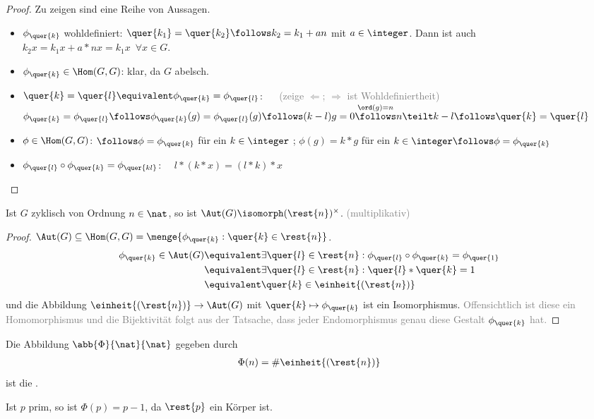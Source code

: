 \begin{proof}
	Zu zeigen sind eine Reihe von Aussagen.
	\begin{itemize}
		\item $\phi_{\quer{k}}$ wohldefiniert: $\quer{k_1} = \quer{k_2} \follows k_2 = k_1 + an$ mit $a \in \integer$. Dann ist auch $k_2 x = k_1 x + a*nx = k_1 x \enspace \forall x \in G$.
		\item $\phi_{\quer{k}} \in \Hom(G,G)$: klar, da $G$ abelsch.
		\item $\quer{k} = \quer{l} \equivalent \phi_{\quer{k}} = \phi_{\quer{l}}$: $\quad$ \textcolor{gray}{(zeige $\Leftarrow$; $\Rightarrow$ ist Wohldefiniertheit)} \\
		$\phi_{\quer{k}} = \phi_{\quer{l}} \follows \phi_{\quer{k}} (g) = \phi_{\quer{l}} (g) \follows (k-l) g = 0 \overset{\ord(g)=n}{\follows} n \teilt k-l \follows \quer{k} = \quer{l}$
		\item $\phi \in \Hom(G,G)$: $\follows \phi = \phi_{\quer{k}}$ für ein $k \in \integer$ ; $\phi(g) = k*g$ für ein $k \in \integer \follows \phi = \phi_{\quer{k}}$
		\item $\phi_{\quer{l}} \circ \phi_{\quer{k}} = \phi_{\quer{kl}}$: $\quad l*(k*x) = (l*k) * x$ \checkmark
	\end{itemize}
\end{proof}
%
\begin{satz}
	Ist $G$ zyklisch von Ordnung $n \in \nat$, so ist $\Aut(G) \isomorph (\rest{n})^{\times}$. \textcolor{gray}{(multiplikativ)}
\end{satz}
\begin{proof}
	$\Aut(G) \subseteq \Hom(G,G) = \menge{\phi_{\quer{k}} : \quer{k} \in \rest{n}}$. \\
	\begin{align*}
		\phi_{\quer{k}} \in \Aut(G) &\equivalent \exists \quer{l} \in \rest{n}: \phi_{\quer{l}} \circ \phi_{\quer{k}} = \phi_{\quer{1}} \\
		&\equivalent \exists \quer{l} \in \rest{n}: \quer{l} * \quer{k} = 1 \\
		&\equivalent \quer{k} \in \einheit{(\rest{n})}
	\end{align*}
	und die Abbildung $\einheit{(\rest{n})} \to \Aut(G)$ mit $\quer{k} \mapsto \phi_{\quer{k}}$ ist ein Isomorphismus. \textcolor{gray}{Offensichtlich ist diese ein Homomorphismus und die Bijektivität folgt aus der Tatsache, dass jeder Endomorphismus genau diese Gestalt $\phi_{\quer{k}}$ hat.}
\end{proof}
%
\begin{defin}
	Die Abbildung $\abb{\Phi}{\nat}{\nat}$ gegeben durch
	\begin{align*}
		\Phi(n) = \# \einheit{(\rest{n})}
	\end{align*}
	ist die .
\end{defin}
%
\begin{bsp}
	Ist $p$ prim, so ist $\Phi(p) = p-1$, da $\rest{p}$ ein Körper ist.
\end{bsp}
